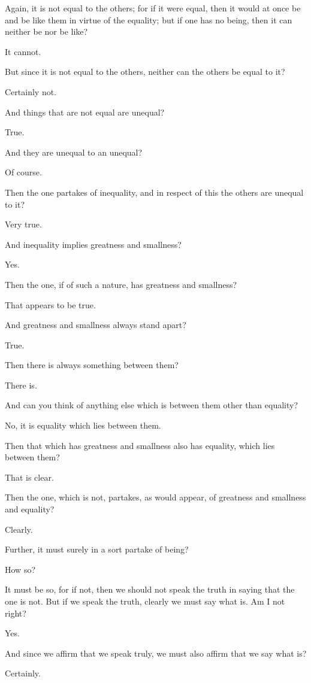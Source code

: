 Again, it is not equal to the others; for if it were equal, then it
would at once be and be like them in virtue of the equality; but if one
has no being, then it can neither be nor be like?

It cannot.

But since it is not equal to the others, neither can the others be equal
to it?

Certainly not.

And things that are not equal are unequal?

True.

And they are unequal to an unequal?

Of course.

Then the one partakes of inequality, and in respect of this the others
are unequal to it?

Very true.

And inequality implies greatness and smallness?

Yes.

Then the one, if of such a nature, has greatness and smallness?

That appears to be true.

And greatness and smallness always stand apart?

True.

Then there is always something between them?

There is.

And can you think of anything else which is between them other than
equality?

No, it is equality which lies between them.

Then that which has greatness and smallness also has equality, which
lies between them?

That is clear.

Then the one, which is not, partakes, as would appear, of greatness and
smallness and equality?

Clearly.

Further, it must surely in a sort partake of being?

How so?

It must be so, for if not, then we should not speak the truth in saying
that the one is not. But if we speak the truth, clearly we must say what
is. Am I not right?

Yes.

And since we affirm that we speak truly, we must also affirm that we say
what is?

Certainly.

